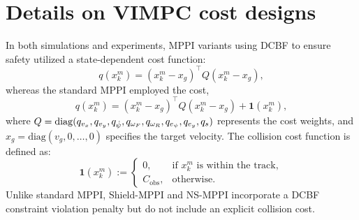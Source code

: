 \section{Details on VIMPC cost designs} \label{app:hw_details}
In both simulations and experiments, MPPI variants using DCBF to ensure safety utilized a state-dependent cost function:
\begin{equation}
    q(x_k^m) = (x_k^m - x_{g})^\intercal Q (x_k^m - x_{g}),
\end{equation}
whereas the standard MPPI employed the cost,
\begin{equation}
    q(x_k^m) = (x_k^m - x_{g})^\intercal Q (x_k^m - x_{g}) + \mathbf{1}(x_k^m),
\end{equation}
where \( Q = \operatorname*{diag}(q_{v_x}, q_{v_y}, q_{\dot{\psi}}, q_{\omega_F}, q_{\omega_R}, q_{e_\psi}, q_{e_y}, q_s) \) represents the cost weights, and \( x_g = \text{diag}(v_g, 0, \dots, 0) \) specifies the target velocity. The collision cost function is defined as:
\begin{equation}\label{JC}
    \mathbf{1}(x_k^m) :=
    \begin{cases}
      0, & \text{if } x_k^m \text{ is within the track}, \\
      C_\text{obs}, & \text{otherwise}.
    \end{cases}
\end{equation}
Unlike standard MPPI, Shield-MPPI and NS-MPPI incorporate a DCBF constraint violation penalty but do not include an explicit collision cost. 
